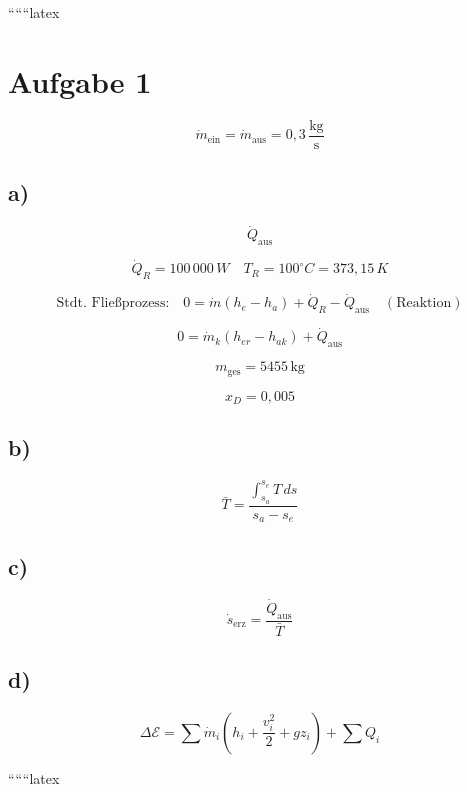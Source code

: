 
``````latex


\section*{Aufgabe 1}

\[
\dot{m}_{\text{ein}} = \dot{m}_{\text{aus}} = 0{,}3 \, \frac{\text{kg}}{\text{s}}
\]

\subsection*{a)}

\[
\dot{Q}_{\text{aus}}
\]

\[
\dot{Q}_R = 100 \, 000 \, W \quad T_R = 100^\circ C = 373{,}15 \, K
\]

\[
\text{Stdt. Fließprozess:} \quad 0 = \dot{m} (h_e - h_a) + \dot{Q}_R - \dot{Q}_{\text{aus}} \quad (\text{Reaktion})
\]

\[
0 = \dot{m}_k (h_{er} - h_{ak}) + \dot{Q}_{\text{aus}}
\]

\[
m_{\text{ges}} = 5455 \, \text{kg}
\]

\[
x_D = 0{,}005
\]

\subsection*{b)}

\[
\bar{T} = \frac{\int_{s_a}^{s_e} T \, ds}{s_a - s_e}
\]

\subsection*{c)}

\[
\dot{s}_{\text{erz}} = \frac{\dot{Q}_{\text{aus}}}{\bar{T}}
\]

\subsection*{d)}

\[
\Delta \mathcal{E} = \sum \dot{m}_i (h_i + \frac{v_i^2}{2} + gz_i) + \sum Q_i
\]

``````latex


